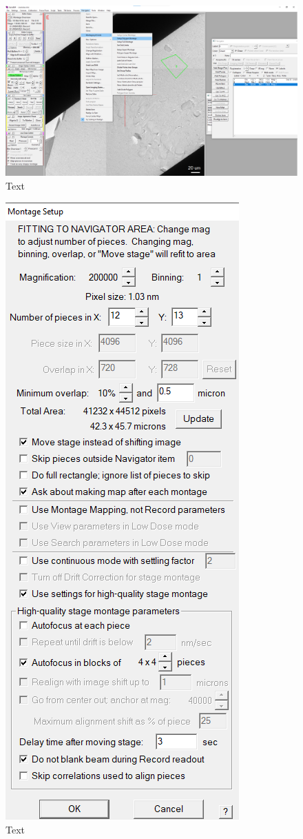 \documentclass[12pt, a4paper]{scrartcl}
\begin{document}
\begin{figure}[H]
\includegraphics[width=\linewidth]{screenshots/SetupPolygonMontage.png}
\caption{Text}
\end{figure}

\begin{figure}[H]
\includegraphics[scale=1]{screenshots/SetupPolygonMontage2.png}
\caption{Text}
\end{figure}
\end{document}
